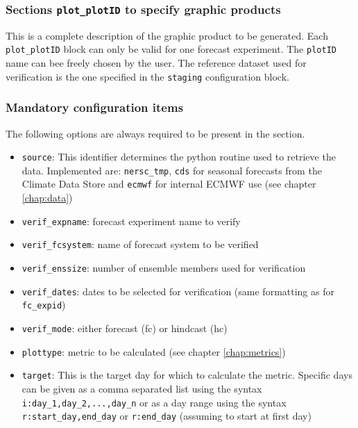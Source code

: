 \documentclass[DIV=10, parskip=full]{scrreprt}
\begin{document}
\subsubsection{Sections \texttt{plot\_plotID} to specify graphic products} \label{sec:plots}
This is a complete description of the graphic product to be generated. Each \texttt{plot\_plotID} block can only be valid for one forecast experiment. The \texttt{plotID} name can bee freely chosen by the user. The reference dataset used for verification is the one specified in the \texttt{staging} configuration block.

\subsubsection{Mandatory configuration items}
The following options are always required to be present in the section.
\begin{itemize}
	\item \texttt{source}: This identifier determines the python routine used to retrieve the data. Implemented are:  \texttt{nersc\_tmp}, \texttt{cds} for seasonal forecasts from the Climate Data Store and \texttt{ecmwf} for internal ECMWF use (see chapter \ref{chap:data})
	\item \texttt{verif\_expname}: forecast experiment name to verify
	\item \texttt{verif\_fcsystem}: name of forecast system to be verified
	\item \texttt{verif\_enssize}: number of ensemble members used for verification 
	\item \texttt{verif\_dates}: dates to be selected for verification (same formatting as for \texttt{fc\_expid})
	\item \texttt{verif\_mode}: either forecast (fc) or hindcast (hc)
	\item \texttt{plottype}: metric to be calculated (see chapter \ref{chap:metrics})
	\item \texttt{target}: This is the target day for which to calculate the metric. Specific days can be given as a comma separated list using the syntax \texttt{i:day\_1,day\_2,...,day\_n} or as a day range using the syntax \texttt{r:start\_day,end\_day} or \texttt{r:end\_day} (assuming to start at first day)
\end{itemize}
\end{document}
